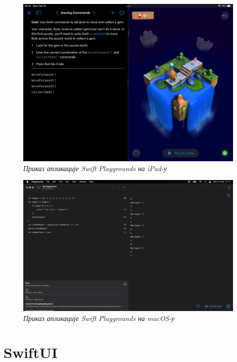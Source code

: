 \documentclass[12pt,oneside]{memoir}
\begin{document}
\begin{figure}[H]
\includegraphics[width=1\textwidth]{images/Swift_Playground_iPad.jpeg}
\centering
\caption{\textit{Приказ апликације Swift Playgrounds на iPad-у}}
\label{slika:swift_playground_ipad}
\end{figure}

\begin{figure}[H]
\includegraphics[width=1\textwidth]{images/Swift_Playground_macOS.png}
\centering
\caption{\textit{Приказ апликације Swift Playgrounds на macOS-у}}
\label{slika:swift_playground_macos}
\end{figure}

\section{SwiftUI}
\label{sec:SwiftUI}
\end{document}
